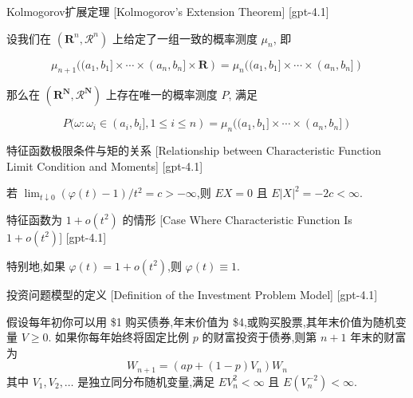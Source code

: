 \documentclass[UTF8]{ctexart}
\begin{document}
    
    
    \begin{thm}
        {Kolmogorov扩展定理}
        [Kolmogorov's Extension Theorem]
        [gpt-4.1]
        
设我们在 $(\mathbf{R}^n, \mathcal{R}^n)$ 上给定了一组一致的概率测度 $\mu_n$, 即

\[
\mu_{n+1}((a_1, b_1] \times \cdots \times (a_n, b_n] \times \mathbf{R}) = \mu_n((a_1, b_1] \times \cdots \times (a_n, b_n])
\]

那么在 $(\mathbf{R}^{\mathbf{N}}, \mathcal{R}^{\mathbf{N}})$ 上存在唯一的概率测度 $P$, 满足

\[
P(\omega : \omega_i \in (a_i, b_i], 1 \le i \le n) = \mu_n((a_1, b_1] \times \cdots \times (a_n, b_n])
\]

    \end{thm}
    
    
    
    \begin{thm}
        {特征函数极限条件与矩的关系}
        [Relationship between Characteristic Function Limit Condition and Moments]
        [gpt-4.1]
        
若 $\lim_{t \downarrow 0} ( \varphi(t) - 1 ) / t^2 = c > -\infty$,则 $E X = 0$ 且 $E|X|^2 = -2c < \infty$.

    \end{thm}
    
    
    
    \begin{crl}
        {特征函数为 $1 + o(t^2)$ 的情形}
        [Case Where Characteristic Function Is $1 + o(t^2)$]
        [gpt-4.1]
        
特别地,如果 $\varphi(t) = 1 + o( t^2 )$,则 $\varphi(t) \equiv 1$.

    \end{crl}
    
    
    
    \begin{dfn}
        {投资问题模型的定义}
        [Definition of the Investment Problem Model]
        [gpt-4.1]
        
假设每年初你可以用 \$1 购买债券,年末价值为 \$4,或购买股票,其年末价值为随机变量 $V \geq 0$.
如果你每年始终将固定比例 $p$ 的财富投资于债券,则第 $n+1$ 年末的财富为
\[
W_{n+1} = (ap + (1-p)V_n)W_n
\]
其中 $V_1, V_2, \dots$ 是独立同分布随机变量,满足 $E V_n^2 < \infty$ 且 $E(V_n^{-2}) < \infty$.

    \end{dfn}
    
\end{document}
